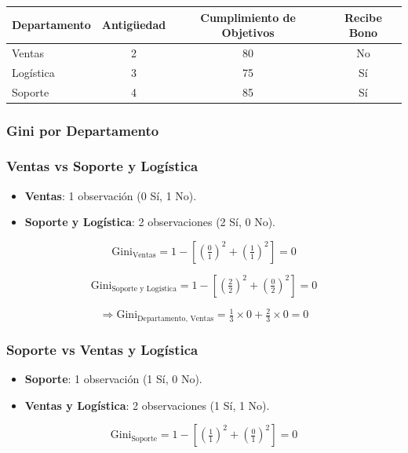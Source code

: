 \documentclass[12pt]{article}
\begin{document}
\begin{table}[h]
  \centering
  \begin{tabular}{lccc}
    \toprule
    Departamento & Antigüedad & Cumplimiento de Objetivos & Recibe Bono \\
    \midrule
    Ventas    & 2 & 80 & No \\
    Logística & 3 & 75 & Sí \\
    Soporte   & 4 & 85 & Sí \\
    \bottomrule
  \end{tabular}
\end{table}

\subsubsection{Gini por Departamento}

\subsubsection{Ventas vs Soporte y Logística}

\begin{itemize}
  \item \textbf{Ventas}: 1 observación (0 Sí, 1 No).
  \item \textbf{Soporte y Logística}: 2 observaciones (2 Sí, 0 No).
\end{itemize}

\[
  \mathrm{Gini}_{\text{Ventas}} = 1 - \left[\left(\tfrac{0}{1}\right)^2 + \left(\tfrac{1}{1}\right)^2\right] = 0
\]

\[
  \mathrm{Gini}_{\text{Soporte y Logística}} = 1 - \left[\left(\tfrac{2}{2}\right)^2 + \left(\tfrac{0}{2}\right)^2\right] = 0
\]

\[
  \Rightarrow \mathrm{Gini}_{\text{Departamento, Ventas}} = \tfrac{1}{3}\times0 + \tfrac{2}{3}\times0 = 0
\]

\subsubsection{Soporte vs Ventas y Logística}

\begin{itemize}
  \item \textbf{Soporte}: 1 observación (1 Sí, 0 No).
  \item \textbf{Ventas y Logística}: 2 observaciones (1 Sí, 1 No).
\end{itemize}

\[
  \mathrm{Gini}_{\text{Soporte}} = 1 - \left[\left(\tfrac{1}{1}\right)^2 + \left(\tfrac{0}{1}\right)^2\right] = 0
\]
\end{document}
